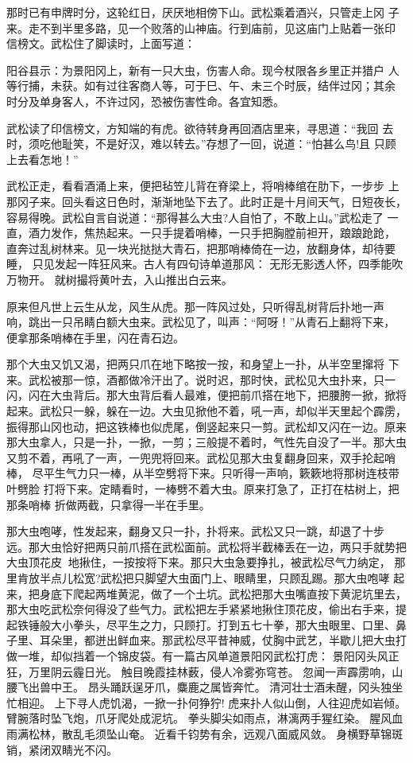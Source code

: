 那时已有申牌时分，这轮红日，厌厌地相傍下山。武松乘着酒兴，只管走上冈
子来。走不到半里多路，见一个败落的山神庙。行到庙前，见这庙门上贴着一张印
信榜文。武松住了脚读时，上面写道：

阳谷县示：为景阳冈上，新有一只大虫，伤害人命。现今杖限各乡里正并猎户
人等行捕，未获。如有过往客商人等，可于巳、午、未三个时辰，结伴过冈；其余
时分及单身客人，不许过冈，恐被伤害性命。各宜知悉。

武松读了印信榜文，方知端的有虎。欲待转身再回酒店里来，寻思道：“我回
去时，须吃他耻笑，不是好汉，难以转去。”存想了一回，说道：“怕甚么鸟!且
只顾上去看怎地！”

武松正走，看看酒涌上来，便把毡笠儿背在脊梁上，将哨棒绾在肋下，一步步
上那冈子来。回头看这日色时，渐渐地坠下去了。此时正是十月间天气，日短夜长，
容易得晚。武松自言自说道：“那得甚么大虫?人自怕了，不敢上山。”武松走了
一直，酒力发作，焦热起来。一只手提着哨棒，一只手把胸膛前袒开，踉踉跄跄，
直奔过乱树林来。见一块光挞挞大青石，把那哨棒倚在一边，放翻身体，却待要睡，
只见发起一阵狂风来。古人有四句诗单道那风：
无形无影透人怀，四季能吹万物开。
就树撮将黄叶去，入山推出白云来。

原来但凡世上云生从龙，风生从虎。那一阵风过处，只听得乱树背后扑地一声
响，跳出一只吊睛白额大虫来。武松见了，叫声：“阿呀！”从青石上翻将下来，
便拿那条哨棒在手里，闪在青石边。

那个大虫又饥又渴，把两只爪在地下略按一按，和身望上一扑，从半空里撺将
下来。武松被那一惊，酒都做冷汗出了。说时迟，那时快，武松见大虫扑来，只一
闪，闪在大虫背后。那大虫背后看人最难，便把前爪搭在地下，把腰胯一掀，掀将
起来。武松只一躲，躲在一边。大虫见掀他不着，吼一声，却似半天里起个霹雳，
振得那山冈也动，把这铁棒也似虎尾，倒竖起来只一剪。武松却又闪在一边。原来
那大虫拿人，只是一扑，一掀，一剪；三般提不着时，气性先自没了一半。那大虫
又剪不着，再吼了一声，一兜兜将回来。武松见那大虫复翻身回来，双手抡起哨棒，
尽平生气力只一棒，从半空劈将下来。只听得一声响，簌簌地将那树连枝带叶劈脸
打将下来。定睛看时，一棒劈不着大虫。原来打急了，正打在枯树上，把那条哨棒
折做两截，只拿得一半在手里。

那大虫咆哮，性发起来，翻身又只一扑，扑将来。武松又只一跳，却退了十步
远。那大虫恰好把两只前爪搭在武松面前。武松将半截棒丢在一边，两只手就势把
大虫顶花皮地揪住，一按按将下来。那只大虫急要挣扎，被武松尽气力纳定，
那里肯放半点儿松宽?武松把只脚望大虫面门上、眼睛里，只顾乱踢。那大虫咆哮
起来，把身底下爬起两堆黄泥，做了一个土坑。武松把那大虫嘴直按下黄泥坑里去，
那大虫吃武松奈何得没了些气力。武松把左手紧紧地揪住顶花皮，偷出右手来，提
起铁锤般大小拳头，尽平生之力，只顾打。打到五七十拳，那大虫眼里、口里、鼻
子里、耳朵里，都迸出鲜血来。那武松尽平昔神威，仗胸中武艺，半歇儿把大虫打
做一堆，却似挡着一个锦皮袋。有一篇古风单道景阳冈武松打虎：
景阳冈头风正狂，万里阴云霾日光。
触目晚霞挂林薮，侵人冷雾弥穹苍。
忽闻一声霹雳响，山腰飞出兽中王。
昂头踊跃逞牙爪，麋鹿之属皆奔忙。
清河壮士酒未醒，冈头独坐忙相迎。
上下寻人虎饥渴，一掀一扑何狰狞!
虎来扑人似山倒，人往迎虎如岩倾。
臂腕落时坠飞炮，爪牙爬处成泥坑。
拳头脚尖如雨点，淋漓两手猩红染。
腥风血雨满松林，散乱毛须坠山奄。
近看千钧势有余，远观八面威风敛。
身横野草锦斑销，紧闭双睛光不闪。

